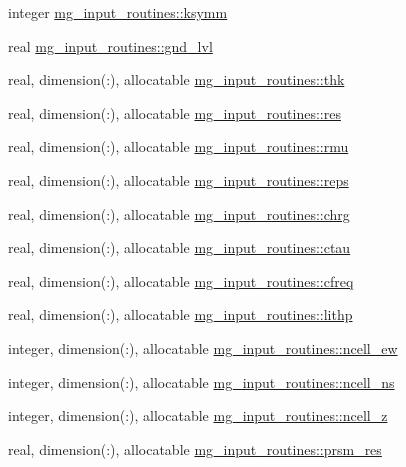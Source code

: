 \begin{DoxyCompactItemize}
\item 
integer \hyperlink{namespacemg__input__routines_ad66a5f5acff5c1b06da85bb8a46384cd}{mg\+\_\+input\+\_\+routines\+::ksymm}
\item 
real \hyperlink{namespacemg__input__routines_a11bf44e1f047050fb335bf4bfc8d1a2c}{mg\+\_\+input\+\_\+routines\+::gnd\+\_\+lvl}
\item 
real, dimension(\+:), allocatable \hyperlink{namespacemg__input__routines_a5f1ec34f2ee179ae5c4b6881a70b2d53}{mg\+\_\+input\+\_\+routines\+::thk}
\item 
real, dimension(\+:), allocatable \hyperlink{namespacemg__input__routines_ae35231b83c0ec2f647d41d0a580e1a6b}{mg\+\_\+input\+\_\+routines\+::res}
\item 
real, dimension(\+:), allocatable \hyperlink{namespacemg__input__routines_ad461ceb35202bc6d598545f113643699}{mg\+\_\+input\+\_\+routines\+::rmu}
\item 
real, dimension(\+:), allocatable \hyperlink{namespacemg__input__routines_a399ade44d53bab22b1416c1c143a807a}{mg\+\_\+input\+\_\+routines\+::reps}
\item 
real, dimension(\+:), allocatable \hyperlink{namespacemg__input__routines_a45b54b5e8dc7da41f04656a21595105c}{mg\+\_\+input\+\_\+routines\+::chrg}
\item 
real, dimension(\+:), allocatable \hyperlink{namespacemg__input__routines_a677ccea5b7c4699e0d7c0620fb4473c7}{mg\+\_\+input\+\_\+routines\+::ctau}
\item 
real, dimension(\+:), allocatable \hyperlink{namespacemg__input__routines_a942bb74999b46c3142791ee0bc5420a0}{mg\+\_\+input\+\_\+routines\+::cfreq}
\item 
real, dimension(\+:), allocatable \hyperlink{namespacemg__input__routines_ace92ffb4ec110b849313b8e1fdc6893a}{mg\+\_\+input\+\_\+routines\+::lithp}
\item 
integer, dimension(\+:), allocatable \hyperlink{namespacemg__input__routines_ac7e71234c4ec9ad59fd8b0d33c8809af}{mg\+\_\+input\+\_\+routines\+::ncell\+\_\+ew}
\item 
integer, dimension(\+:), allocatable \hyperlink{namespacemg__input__routines_aec49c121aaee899e4b0f33bf6943bcb4}{mg\+\_\+input\+\_\+routines\+::ncell\+\_\+ns}
\item 
integer, dimension(\+:), allocatable \hyperlink{namespacemg__input__routines_a0a0ce37b6540f74233bf3aadaa260f96}{mg\+\_\+input\+\_\+routines\+::ncell\+\_\+z}
\item 
real, dimension(\+:), allocatable \hyperlink{namespacemg__input__routines_a88f6097023f8d53acf45a2cd7f976344}{mg\+\_\+input\+\_\+routines\+::prsm\+\_\+res}

\end{DoxyCompactItemize}

